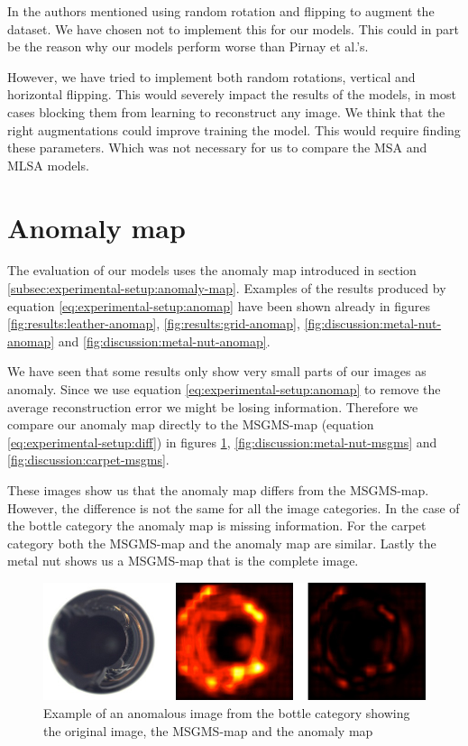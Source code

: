 In \cite{pirnay_inpainting_2021} the authors mentioned using random rotation and flipping to augment the dataset. We have chosen not to implement this for our models. This could in part be the reason why our models perform worse than Pirnay et al.'s. 

However, we have tried to implement both random rotations, vertical and horizontal flipping. This would severely impact the results of the models, in most cases blocking them from learning to reconstruct any image. We think that the right augmentations could improve training the model. This would require finding these parameters. Which was not necessary for us to compare the MSA and MLSA models.

\section{Anomaly map}

The evaluation of our models uses the anomaly map introduced in section \ref{subsec:experimental-setup:anomaly-map}. Examples of the results produced by equation \ref{eq:experimental-setup:anomap} have been shown already in figures \ref{fig:results:leather-anomap}, \ref{fig:results:grid-anomap}, \ref{fig:discussion:metal-nut-anomap} and \ref{fig:discussion:metal-nut-anomap}.

We have seen that some results only show very small parts of our images as anomaly. Since we use equation \ref{eq:experimental-setup:anomap} to remove the average reconstruction error we might be losing information. Therefore we compare our anomaly map directly to the MSGMS-map (equation \ref{eq:experimental-setup:diff}) in figures \ref{fig:discussion:bottle-msgms}, \ref{fig:discussion:metal-nut-msgms} and \ref{fig:discussion:carpet-msgms}.

These images show us that the anomaly map differs from the MSGMS-map. However, the difference is not the same for all the image categories. In the case of the bottle category the anomaly map is missing information. For the carpet category both the MSGMS-map and the anomaly map are similar. Lastly the metal nut shows us a MSGMS-map that is the complete image.

\begin{figure}[ht!]
\centering
\includegraphics[width=\textwidth]{imgs/samples/bottle-ano-msgms.jpg}
\caption{Example of an anomalous image from the bottle category showing the original image, the MSGMS-map and the anomaly map}
\label{fig:discussion:bottle-msgms}
\end{figure}

